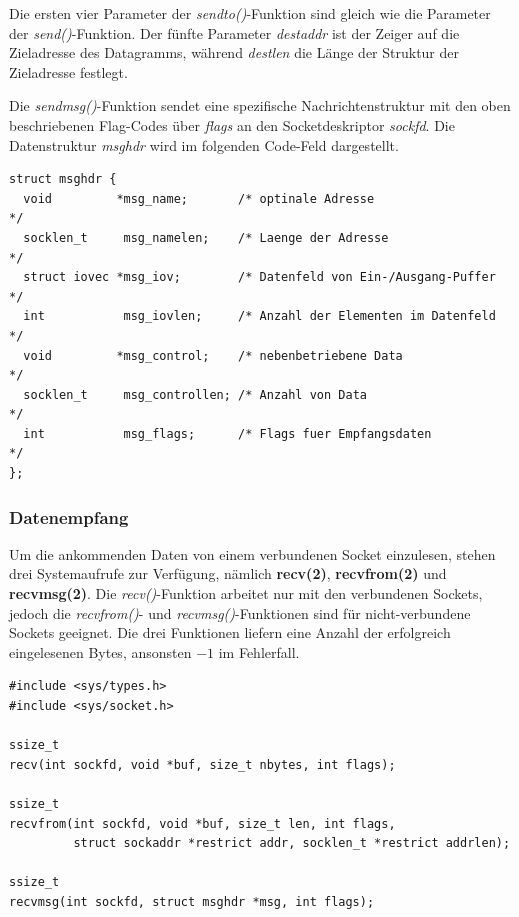 Die ersten vier Parameter der \textit{sendto()}-Funktion sind gleich wie die Parameter der \textit{send()}-Funktion. Der fünfte Parameter \textit{destaddr} ist der Zeiger auf die Zieladresse des Datagramms, während \textit{destlen} die Länge der Struktur der Zieladresse festlegt. \smallskip \smallskip

Die \textit{sendmsg()}-Funktion sendet eine spezifische Nachrichtenstruktur mit den oben beschriebenen Flag-Codes über \textit{flags} an den Socketdeskriptor \textit{sockfd}. Die Datenstruktur \textit{msghdr} wird im folgenden Code-Feld dargestellt. \smallskip \smallskip

\begin{verbatim}
struct msghdr {
  void         *msg_name;       /* optinale Adresse                  */
  socklen_t     msg_namelen;    /* Laenge der Adresse                */
  struct iovec *msg_iov;        /* Datenfeld von Ein-/Ausgang-Puffer */
  int           msg_iovlen;     /* Anzahl der Elementen im Datenfeld */
  void         *msg_control;    /* nebenbetriebene Data              */
  socklen_t     msg_controllen; /* Anzahl von Data                   */
  int           msg_flags;      /* Flags fuer Empfangsdaten          */
};
\end{verbatim}

\subsubsection{Datenempfang}

Um die ankommenden Daten von einem verbundenen Socket einzulesen, stehen drei Systemaufrufe zur Verfügung, nämlich \textbf{recv(2)}, \textbf{recvfrom(2)} und \textbf{recvmsg(2)}. Die \textit{recv()}-Funktion arbeitet nur mit den verbundenen Sockets, jedoch die \textit{recvfrom()}- und \textit{recvmsg()}-Funktionen sind für nicht-verbundene Sockets geeignet. Die drei Funktionen liefern eine Anzahl der erfolgreich eingelesenen Bytes, ansonsten $-1$ im Fehlerfall. \smallskip \smallskip

\begin{verbatim}
#include <sys/types.h>
#include <sys/socket.h>

ssize_t
recv(int sockfd, void *buf, size_t nbytes, int flags);

ssize_t
recvfrom(int sockfd, void *buf, size_t len, int flags,
         struct sockaddr *restrict addr, socklen_t *restrict addrlen);

ssize_t
recvmsg(int sockfd, struct msghdr *msg, int flags);
\end{verbatim}

